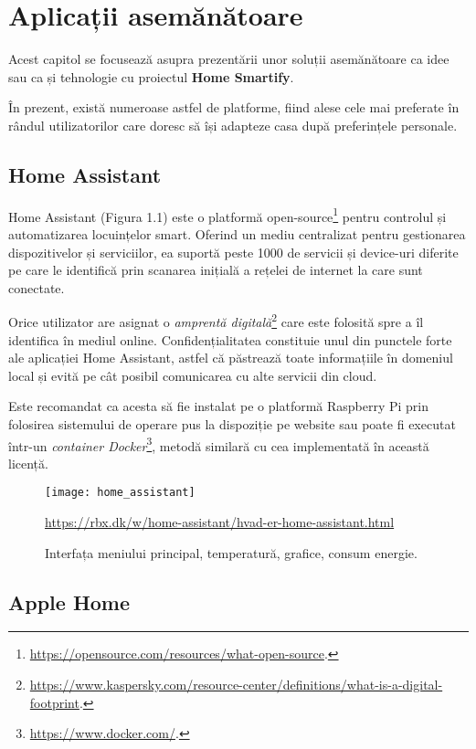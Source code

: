\chapter{Aplicații asemănătoare}

Acest capitol se focusează asupra prezentării unor soluții asemănătoare ca idee sau ca și tehnologie cu proiectul \textbf{Home Smartify}. 

În prezent, există numeroase astfel de platforme, fiind alese cele mai preferate în rândul utilizatorilor care doresc să își adapteze casa după preferințele personale.

\section{Home Assistant}

Home Assistant (Figura 1.1) este o platformă open-source\footnote{\url{https://opensource.com/resources/what-open-source}.} pentru controlul și automatizarea locuințelor smart. Oferind un mediu centralizat pentru gestionarea dispozitivelor și serviciilor, ea suportă peste 1000 de servicii și device-uri diferite pe care le identifică prin scanarea inițială a rețelei de internet la care sunt conectate.

Orice utilizator are asignat o \emph{amprentă digitală}\footnote{\url{https://www.kaspersky.com/resource-center/definitions/what-is-a-digital-footprint}.} care este folosită spre a îl identifica în mediul online. Confidențialitatea constituie unul din punctele forte ale aplicației Home Assistant, astfel că păstrează toate informațiile în domeniul local și evită pe cât posibil comunicarea cu alte servicii din cloud. 

Este recomandat ca acesta să fie instalat pe o platformă Raspberry Pi prin folosirea sistemului de operare pus la dispoziție pe website sau poate fi executat într-un \emph{container Docker}\footnote{\url{https://www.docker.com/}.}, metodă similară cu cea implementată în această licență.

\begin{figure}[h]
	\centering
	\texttt{[image: home\_assistant]}
	\caption{Interfața meniului principal, temperatură, grafice, consum energie.}\url{https://rbx.dk/w/home-assistant/hvad-er-home-assistant.html}
	\label{fig:home_assistant}
\end{figure}

\section{Apple Home}

